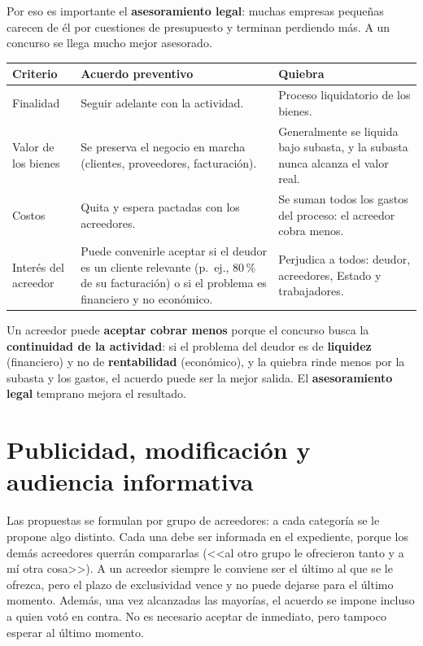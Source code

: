 \documentclass[12pt,oneside]{book}
\begin{document}
Por eso es importante el \textbf{asesoramiento legal}: muchas empresas pequeñas carecen de él por cuestiones de presupuesto y terminan perdiendo más. A un concurso se llega mucho mejor asesorado.

\begin{center}
\small
\begin{tabularx}{\textwidth}{P{2.6cm} Y Y}
\toprule
\textbf{Criterio} & \textbf{Acuerdo preventivo} & \textbf{Quiebra} \\
\midrule
Finalidad & Seguir adelante con la actividad. & Proceso liquidatorio de los bienes. \\
Valor de los bienes & Se preserva el negocio en marcha (clientes, proveedores, facturación). & Generalmente se liquida bajo subasta, y la subasta nunca alcanza el valor real. \\
Costos & Quita y espera pactadas con los acreedores. & Se suman todos los gastos del proceso: el acreedor cobra menos. \\
Interés del acreedor & Puede convenirle aceptar si el deudor es un cliente relevante (p.\ ej., 80\,\% de su facturación) o si el problema es financiero y no económico. & Perjudica a todos: deudor, acreedores, Estado y trabajadores. \\
\bottomrule
\end{tabularx}
\end{center}

\begin{important}
Un acreedor puede \textbf{aceptar cobrar menos} porque el concurso busca la \textbf{continuidad de la actividad}: si el problema del deudor es de \textbf{liquidez} (financiero) y no de \textbf{rentabilidad} (económico), y la quiebra rinde menos por la subasta y los gastos, el acuerdo puede ser la mejor salida. El \textbf{asesoramiento legal} temprano mejora el resultado.
\end{important}

\section{Publicidad, modificación y audiencia informativa}

Las propuestas se formulan por grupo de acreedores: a cada categoría se le propone algo distinto. Cada una debe ser informada en el expediente, porque los demás acreedores querrán compararlas (<<al otro grupo le ofrecieron tanto y a mí otra cosa>>). A un acreedor siempre le conviene ser el último al que se le ofrezca, pero el plazo de exclusividad vence y no puede dejarse para el último momento. Además, una vez alcanzadas las mayorías, el acuerdo se impone incluso a quien votó en contra. No es necesario aceptar de inmediato, pero tampoco esperar al último momento.
\end{document}
